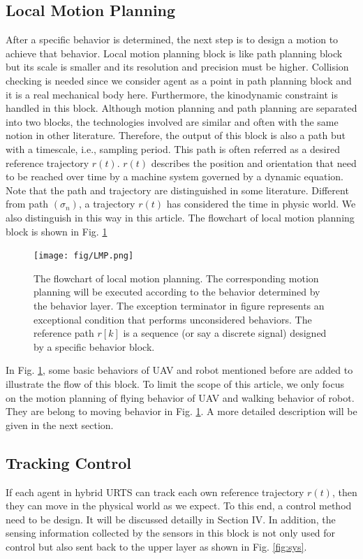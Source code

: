 \documentclass{ieeeaccess}
\begin{document}
\subsection{Local Motion Planning}
After a specific behavior is determined, the next step is to design a motion to achieve that behavior. Local motion planning block is like path planning block but its scale is smaller and its resolution and precision must be higher. Collision checking is needed since we consider agent as a point in path planning block and it is a real mechanical body here. Furthermore, the kinodynamic constraint is handled in this block. Although motion planning and path planning are separated into two blocks, the technologies involved are similar and often with the same notion in other literature. Therefore, the output of this block is also a path but with a timescale, i.e., sampling period. This path is often referred as a desired reference trajectory $r(t)$. $r(t)$ describes the position and orientation that need to be reached over time by a machine system governed by a dynamic equation. Note that the path and trajectory are distinguished in some literature. Different from path $(\sigma_n)$, a trajectory $r(t)$ has considered the time in physic world. We also distinguish in this way in this article. The flowchart of local motion planning block is shown in Fig. \ref{fig:LocalMotionPlanning}
\begin{figure}[htbp]
    \centering
    \texttt{[image: fig/LMP.png]}\caption{The flowchart of local motion planning. The corresponding motion planning will be executed according to the behavior determined by the behavior layer. The exception terminator in figure represents an exceptional condition that performs unconsidered behaviors. The reference path $r[k]$ is a sequence (or say a discrete signal) designed by a specific behavior block.}
    \label{fig:LocalMotionPlanning}
\end{figure}

In Fig. \ref{fig:LocalMotionPlanning}, some basic behaviors of UAV and robot mentioned before are added to illustrate the flow of this block. To limit the scope of this article, we only focus on the motion planning of flying behavior of UAV and walking behavior of robot. They are belong to moving behavior in Fig. \ref{fig:LocalMotionPlanning}. A more detailed description will be given in the next section.

\subsection{Tracking Control}
If each agent in hybrid URTS can track each own reference trajectory $r(t)$, then they can move in the physical world as we expect. To this end, a control method need to be design. It will be discussed detailly in Section IV. In addition, the sensing information collected by the sensors in this block is not only used for control but also sent back to the upper layer as shown in Fig. \ref{fig:sys}.
\end{document}
